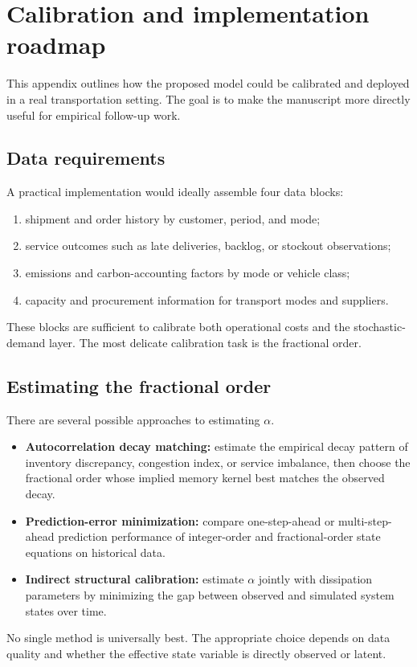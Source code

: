 \section{Calibration and implementation roadmap}
This appendix outlines how the proposed model could be calibrated and deployed in a real transportation setting. The goal is to make the manuscript more directly useful for empirical follow-up work.

\subsection{Data requirements}
A practical implementation would ideally assemble four data blocks:
\begin{enumerate}[label=\textbf{D\arabic*.},leftmargin=2.0em]
    \item shipment and order history by customer, period, and mode;
    \item service outcomes such as late deliveries, backlog, or stockout observations;
    \item emissions and carbon-accounting factors by mode or vehicle class;
    \item capacity and procurement information for transport modes and suppliers.
\end{enumerate}
These blocks are sufficient to calibrate both operational costs and the stochastic-demand layer. The most delicate calibration task is the fractional order.

\subsection{Estimating the fractional order}
There are several possible approaches to estimating $\alpha$.
\begin{itemize}[leftmargin=1.8em]
    \item \textbf{Autocorrelation decay matching:} estimate the empirical decay pattern of inventory discrepancy, congestion index, or service imbalance, then choose the fractional order whose implied memory kernel best matches the observed decay.
    \item \textbf{Prediction-error minimization:} compare one-step-ahead or multi-step-ahead prediction performance of integer-order and fractional-order state equations on historical data.
    \item \textbf{Indirect structural calibration:} estimate $\alpha$ jointly with dissipation parameters by minimizing the gap between observed and simulated system states over time.
\end{itemize}
No single method is universally best. The appropriate choice depends on data quality and whether the effective state variable is directly observed or latent.

